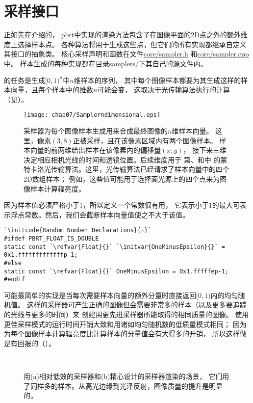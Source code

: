 \section{采样接口}\label{sec:采样接口}
正如先在介绍的，
pbrt中实现的渲染方法包含了在图像平面的2D点之外的额外维度上选择样本点。
各种算法将用于生成这些点，但它们的所有实现都继承自定义其接口的抽象类。
核心采样声明和函数在文件\href{https://github.com/mmp/pbrt-v3/blob/master/src/core/sampler.h}{\ttfamily core/sampler.h}
和\href{https://github.com/mmp/pbrt-v3/blob/master/src/core/sampler.cpp}{\ttfamily core/sampler.cpp}中。
样本生成的每种实现都在目录{\ttfamily samplers/}下其自己的源文件内。

的任务是生成$[0,1)^n$中$n$维样本的序列，
其中每个图像样本都要为其生成这样的样本向量，且每个样本中的维数$n$可能会变，
这取决于光传输算法执行的计算（见）。
\begin{figure}[htbp]
    \centering\texttt{[image: chap07/Samplerndimensional.eps]}
    \caption{采样器为每个图像样本生成用来合成最终图像的$n$维样本向量。
        这里，像素$(3,8)$正被采样，且在该像素区域内有两个图像样本。
        样本向量的前两维给出样本在该像素内的偏移量$(x,y)$，
        接下来三维决定相应相机光线的时间和透镜位置。后续维度用于
        第、和中
        的蒙特卡洛光传输算法。这里，光传输算法已经请求了样本向量中的四个2D数组样本；
        例如，这些值可能用于选择面光源上的四个点来为图像样本计算辐亮度。}
    \label{fig:7.13}
\end{figure}

因为样本值必须严格小于1，所以定义一个常数很有用，
它表示小于1的最大可表示浮点常数。然后，我们会截断样本向量值使之不大于该值。
\begin{lstlisting}
`\initcode{Random Number Declarations}{=}`
#ifdef PBRT_FLOAT_IS_DOUBLE
static const `\refvar{Float}{}` `\initvar{OneMinusEpsilon}{}` = 0x1.fffffffffffffp-1;
#else
static const `\refvar{Float}{}` OneMinusEpsilon = 0x1.fffffep-1;
#endif
\end{lstlisting}

可能最简单的实现是当每次需要样本向量的额外分量时直接返回$[0,1)$内的均匀随机值。
这样的采样器可产生正确的图像但会需要非常多的样本（以及更多要追踪的光线与更多的时间）来
创建用更先进采样器所能取得的相同质量的图像。
使用更佳采样模式的运行时间开销大致和用诸如均匀随机数的低质量模式相同；
因为为每个图像样本计算辐亮度比计算样本的分量值会有大得多的开销，
所以这样做是有回报的（）。
\begin{figure}[htbp]
    \centering
    \\
    \caption{用(a)相对低效的采样器和(b)精心设计的采样器渲染的场景，
        它们用了同样多的样本。从高光边缘到光泽反射，图像质量的提升是明显的。}
    \label{fig:7.14}
\end{figure}


